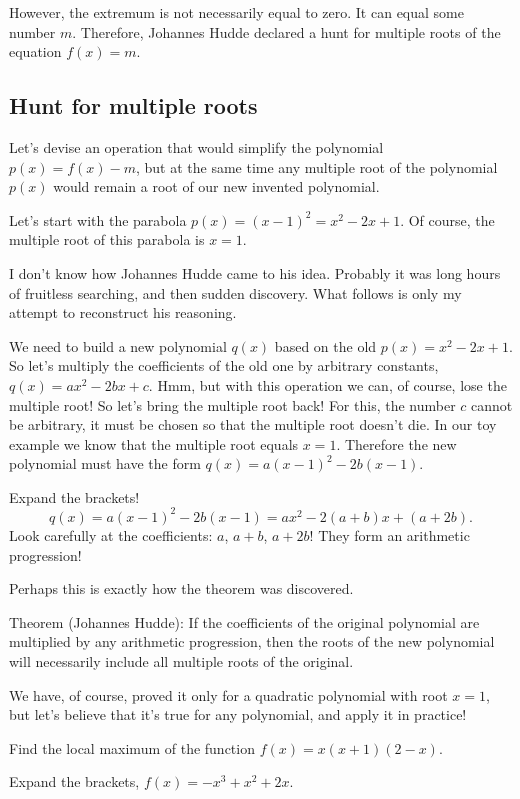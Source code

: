 \documentclass[12pt]{article}
\begin{document}
However, the extremum is not necessarily equal to zero. 
It can equal some number $m$.
Therefore, Johannes Hudde declared a hunt for multiple roots of the equation $f(x) = m$.


\subsection*{Hunt for multiple roots}

Let's devise an operation that would simplify the polynomial $p(x) = f(x) - m$, 
but at the same time any multiple root of the polynomial $p(x)$ would remain a root of our new invented polynomial.

Let's start with the parabola $p(x) = (x - 1)^2 = x^2 - 2x + 1$. 
Of course, the multiple root of this parabola is $x = 1$.


I don't know how Johannes Hudde came to his idea. 
Probably it was long hours of fruitless searching, and then sudden discovery. 
What follows is only my attempt to reconstruct his reasoning. 

We need to build a new polynomial $q(x)$ based on the old $p(x) = x^2 - 2x + 1$.
So let's multiply the coefficients of the old one by arbitrary constants, $q(x) = ax^2 - 2bx + c$. 
Hmm, but with this operation we can, of course, lose the multiple root! 
So let's bring the multiple root back! 
For this, the number $c$ cannot be arbitrary, it must be chosen so that the multiple root doesn't die. 
In our toy example we know that the multiple root equals $x = 1$.
Therefore the new polynomial must have the form $q(x) = a(x - 1)^2 - 2b (x - 1)$.

Expand the brackets!
\[
    q(x) = a(x - 1)^2 - 2b (x - 1) = ax^2 - 2(a + b) x + (a + 2b).
\]
Look carefully at the coefficients: $a$, $a + b$, $a + 2b$!
They form an arithmetic progression!

Perhaps this is exactly how the theorem was discovered.

Theorem (Johannes Hudde):
If the coefficients of the original polynomial are multiplied by any arithmetic progression,
then the roots of the new polynomial will necessarily include all multiple roots of the original.

We have, of course, proved it only for a quadratic polynomial with root $x=1$, but let's believe that it's true for any polynomial, and apply it in practice!

Find the local maximum of the function $f(x) = x (x + 1) (2 - x)$.

Expand the brackets, $f(x) = -x^3 + x^2 + 2x$.
\end{document}
